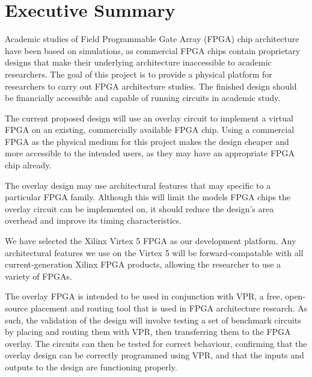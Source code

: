 \thispagestyle{empty}
\section*{Executive Summary}


Academic studies of Field Programmable Gate Array (FPGA) chip architecture have been based on simulations, as commercial FPGA chips contain proprietary designs that make their underlying architecture inaccessible to academic researchers.
The goal of this project is to provide a physical platform for researchers to carry out FPGA architecture studies.
The finished design should be financially accessible and capable of running circuits in academic study.

The current proposed design will use an overlay circuit to implement a virtual FPGA on an existing, commercially available FPGA chip.
Using a commercial FPGA as the physical medium for this project makes the design cheaper and more accessible to the intended users, as they may have an appropriate FPGA chip already.

The overlay design may use architectural features that may specific to a particular FPGA family.
Although this will limit the models FPGA chips the overlay circuit can be implemented on, it should reduce the design's area overhead and improve its timing characteristics.

We have selected the Xilinx Virtex 5 FPGA as our development platform.
Any architectural features we use on the Virtex 5 will be forward-compatable with all current-generation Xilinx FPGA products, allowing the researcher to use a variety of FPGAs.

The overlay FPGA is intended to be used in conjunction with VPR, a free, open-source placement and routing tool that is used in FPGA architecture research.
As such, the validation of the design will involve testing a set of benchmark circuits by placing and routing them with VPR, then transferring them to the FPGA overlay.
The circuits can then be tested for correct behaviour, confirming that the overlay design can be correctly programmed using VPR, and that the inputs and outputs to the design are functioning properly.

